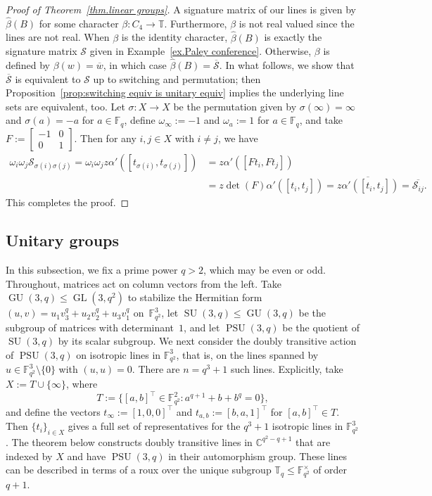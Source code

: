 \begin{proof}[Proof of Theorem~\ref{thm.linear groups}]
A signature matrix of our lines is given by $\hat\beta(B)$ for some character $\beta\colon C_4\to\mathbb{T}$.
Furthermore, $\beta$ is not real valued since the lines are not real.
When $\beta$ is the identity character, $\hat\beta(B)$ is exactly the signature matrix $\mathcal{S}$ given in Example~\ref{ex.Paley conference}.
Otherwise, $\beta$ is defined by $\beta(w)=\overline{w}$, in which case $\hat\beta(B)=\overline{\mathcal{S}}$.
In what follows, we show that $\overline{\mathcal{S}}$ is equivalent to $\mathcal{S}$ up to switching and permutation; then Proposition~\ref{prop:switching equiv is unitary equiv} implies the underlying line sets are equivalent, too.
Let $\sigma\colon X\to X$ be the permutation given by $\sigma(\infty)=\infty$ and $\sigma(a)=-a$ for $a\in\mathbb{F}_q$, define $\omega_\infty:=-1$ and $\omega_a:=1$ for $a\in\mathbb{F}_q$, and take $F:=\left[\begin{array}{cc}-1&0\\0&1\end{array}\right]$.
Then for any $i,j\in X$ with $i\neq j$, we have
\begin{align*}
\omega_i\omega_j\mathcal{S}_{\sigma(i)\sigma(j)}
=\omega_i\omega_jz\alpha'([t_{\sigma(i)},t_{\sigma(j)}])
&=z\alpha'([Ft_{i},Ft_{j}]) \\
&=z\operatorname{det}(F)\alpha'([t_{i},t_{j}])
=\overline{z\alpha'([t_{i},t_{j}])}
=\overline{\mathcal{S}_{ij}}.
\end{align*}
This completes the proof.
\end{proof}




\subsection{Unitary groups}
\label{subsec:unitary}

In this subsection, we fix a prime power $q>2$, which may be even or odd.
Throughout, matrices act on column vectors from the left.
Take $\operatorname{GU}(3,q) \leq \operatorname{GL}(3,q^2)$ to stabilize the Hermitian form $(u,v) = u_1 v_3^q + u_2 v_2^q + u_3 v_1^q$ on~$\mathbb{F}_{q^2}^3$, let $\operatorname{SU}(3,q) \leq \operatorname{GU}(3,q)$ be the subgroup of matrices with determinant~$1$, and let $\operatorname{PSU}(3,q)$ be the quotient of $\operatorname{SU}(3,q)$ by its scalar subgroup.
We next consider the doubly transitive action of $\operatorname{PSU}(3,q)$ on isotropic lines in $\mathbb{F}_{q^2}^3$, that is, on the lines spanned by $u \in \mathbb{F}_{q^2}^3 \setminus \{0 \}$ with $(u,u) = 0$.
There are $n = q^3 + 1$ such lines.
Explicitly, take $X:=T\cup\{\infty\}$, where
\[
T:=\{[a,b]^\top\in\mathbb{F}_{q^2}^2:a^{q+1}+b+b^q=0\},
\]
and define the vectors $t_\infty:=[1,0,0]^\top$ and 
$t_{a,b}:=[b,a,1]^\top$ 
for $[a,b]^\top\in T$.
Then $\{t_i\}_{i\in X}$ gives a full set of representatives for the $q^3+1$ isotropic lines in $\mathbb{F}_{q^2}^3$.
The theorem below constructs doubly transitive lines in $\mathbb{C}^{q^2-q+1}$ that are indexed by $X$ and have $\operatorname{PSU}(3,q)$ in their automorphism group.
These lines can be described in terms of a roux over the unique subgroup $\mathbb{T}_q\leq\mathbb{F}_{q^2}^\times$ of order $q+1$.


